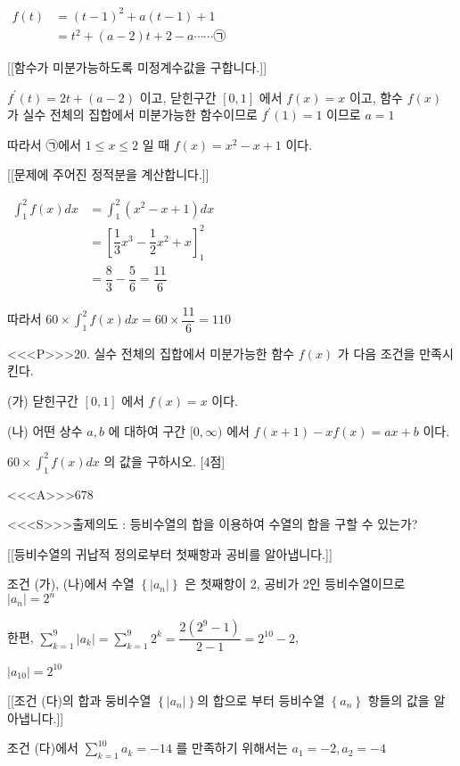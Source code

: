 \documentclass{oblivoir}
\begin{document}
$\begin{aligned} f(t) &=(t-1)^{2}+a(t-1)+1\\
&=t^{2}+(a-2) t+2-a \cdots \cdots \text{㉠} \end{aligned} $ 

[[함수가 미분가능하도록 미정계수값을 구합니다.]]

$f^{\prime}(t)=2 t+(a-2)$ 이고, 닫힌구간 $[0,1]$ 에서 $f(x)=x$ 이고, 함수 $f(x)$ 가 실수 전체의 집합에서 미분가능한 함수이므로 $f^{\prime}(1)=1$ 이므로 $a=1$

따라서 ㉠에서 $1 \leq x \leq 2$ 일 때
$f(x)=x^{2}-x+1$ 이다.

[[문제에 주어진 정적분을 계산합니다.]]

$ \begin{aligned}\displaystyle\int_{1}^{2} f(x) d x &=\displaystyle\int_{1}^{2}\left(x^{2}-x+1\right) d x\\
&=\left[\dfrac{1}{3} x^{3}-\dfrac{1}{2} x^{2}+x\right]_{1}^{2}\\
&=\dfrac{8}{3}-\dfrac{5}{6}=\dfrac{11}{6}\end{aligned}$

따라서 $60 \times \displaystyle\int_{1}^{2} f(x) d x=60 \times \dfrac{11}{6} =110$


<<<P>>>20. 실수 전체의 집합에서 미분가능한 함수 $f(x)$ 가 다음 조건을 만족시킨다.

(가) 닫힌구간 $[0,1]$ 에서 $f(x)=x$ 이다.

(나) 어떤 상수 $a, b$ 에 대하여 구간 $[0, \infty)$ 에서 $f(x+1)-x f(x)=a x+b$ 이다.

$60 \times \displaystyle\int_{1}^{2} f(x) d x$ 의 값을 구하시오. [4점]


<<<A>>>$678$

<<<S>>>출제의도 : 등비수열의 합을 이용하여 수열의 합을 구할 수 있는가?

[[등비수열의 귀납적 정의로부터 첫째항과 공비를 알아냅니다.]]

조건 (가), (나)에서 수열 $\left\{\left|a_{n}\right|\right\}$ 은 첫째항이 2, 공비가 2인 등비수열이므로
$\left|a_{n}\right|=2^{n}$

한편,
$\displaystyle\sum_{k=1}^{9}\left|a_{k}\right|=\displaystyle\sum_{k=1}^{9} 2^{k}=\dfrac{2\left(2^{9}-1\right)}{2-1}=2^{10}-2$,

$\left|a_{10}\right|=2^{10}$

[[조건 (다)의 합과 둥비수열 $\left\{\left|a_{n}\right|\right\}$의 합으로 부터 등비수열  $\left\{a_{n}\right\}$ 항들의 값을 알아냅니다.]]

조건 (다)에서 $\displaystyle\sum_{k=1}^{10} a_{k}=-14$ 를 만족하기 위해서는
$a_{1}=-2, a_{2}=-4$
\end{document}
